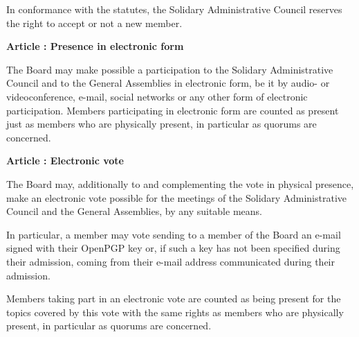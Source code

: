 \documentclass [11pt]{article}
\renewcommand {\section}[1]{\stepcounter {section}%
{\vspace {1em}\noindent\Large \bf Article \thesection: #1 \par}}
\begin{document}
In conformance with the statutes, the Solidary Administrative Council
reserves the right to accept or not a new member.


\section {Presence in electronic form}

The Board may make possible a participation to the Solidary Administrative
Council and to the General Assemblies in electronic form, be it by
audio- or videoconference, e-mail, social networks or any other form
of electronic participation.
Members participating in electronic form are counted as present just
as members who are physically present, in particular as quorums are
concerned.


\section {Electronic vote}

The Board may, additionally to and complementing the vote in
physical presence, make an electronic vote possible for the meetings
of the Solidary Administrative Council and the General Assemblies,
by any suitable means.

In particular, a member may vote sending to a member of the Board an
e-mail signed with their OpenPGP key or, if such a key has not been
specified during their admission, coming from their e-mail address
communicated during their admission.

Members taking part in an electronic vote are counted as being present
for the topics covered by this vote with the same rights as members
who are physically present, in particular as quorums are concerned.
\end{document}
